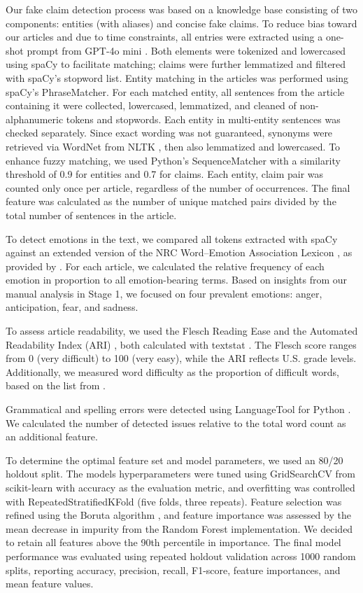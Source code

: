 \documentclass[12pt,a4paper,twocolumn]{article}
\begin{document}
Our fake claim detection process was based on a knowledge base consisting of two components: entities (with aliases) and concise fake claims. To reduce bias toward our articles and due to time constraints, all entries were extracted using a one-shot prompt from GPT-4o mini \citep{openai_gpt4o_mini}. Both elements were tokenized and lowercased using spaCy to facilitate matching; claims were further lemmatized and filtered with spaCy’s stopword list. Entity matching in the articles was performed using spaCy’s PhraseMatcher. For each matched entity, all sentences from the article containing it were collected, lowercased, lemmatized, and cleaned of non-alphanumeric tokens and stopwords. Each entity in multi-entity sentences was checked separately. Since exact wording was not guaranteed, synonyms were retrieved via WordNet from NLTK \citep{NLTK}, then also lemmatized and lowercased. To enhance fuzzy matching, we used Python’s SequenceMatcher with a similarity threshold of 0.9 for entities and 0.7 for claims. Each entity, claim pair was counted only once per article, regardless of the number of occurrences. The final feature was calculated as the number of unique matched pairs divided by the total number of sentences in the article.

To detect emotions in the text, we compared all tokens extracted with spaCy against an extended version of the NRC Word–Emotion Association Lexicon \citep{emotions}, as provided by \citet{NRClex}. For each article, we calculated the relative frequency of each emotion in proportion to all emotion-bearing terms. Based on insights from our manual analysis in Stage 1, we focused on four prevalent emotions: anger, anticipation, fear, and sadness.

To assess article readability, we used the Flesch Reading Ease \citep{flesch} and the Automated Readability Index (ARI) \citep{senter_smith_1967}, both calculated with textstat \citep{textstat}. The Flesch score ranges from 0 (very difficult) to 100 (very easy), while the ARI reflects U.S. grade levels. Additionally, we measured word difficulty as the proportion of difficult words, based on the list from \citet{chall1995readability}.

Grammatical and spelling errors were detected using LanguageTool for Python \citep{ltp}. We calculated the number of detected issues relative to the total word count as an additional feature.

To determine the optimal feature set and model parameters, we used an 80/20 holdout split. The models hyperparameters were tuned using GridSearchCV from scikit-learn with accuracy as the evaluation metric, and overfitting was controlled with RepeatedStratifiedKFold (five folds, three repeats). Feature selection was refined using the Boruta algorithm \citep{boruta1, boruta2}, and feature importance was assessed by the mean decrease in impurity from the Random Forest implementation. We decided to retain all features above the 90th percentile in importance. The final model performance was evaluated using repeated holdout validation across 1000 random splits, reporting accuracy, precision, recall, F1-score, feature importances, and mean feature values.
\end{document}
